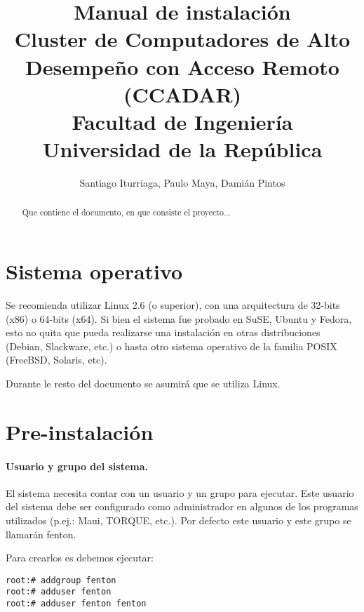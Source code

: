 \documentclass[a4paper,10pt,spanish]{article}
\begin{document}
\title{Manual de instalaci\'{o}n\\
Cluster de Computadores de Alto Desempe\~{n}o con Acceso Remoto (CCADAR)\\
Facultad de Ingenier\'{i}a\\
Universidad de la Rep\'{u}blica}

\author{Santiago Iturriaga, Paulo Maya, Dami\'{a}n Pintos}
\date{}

\maketitle
\begin{abstract}
Que contiene el documento, en que consiste el proyecto...
\end{abstract}
\newpage{}\tableofcontents{}\newpage{}

\section{Sistema operativo}

Se recomienda utilizar Linux 2.6 (o superior), con una arquitectura de 32-bits (x86) o 64-bits (x64). Si bien el sistema fue probado en SuSE, Ubuntu y Fedora, esto no quita que pueda realizarse una instalaci\'{o}n en otras distribuciones (Debian, Slackware, etc.) o hasta otro sistema operativo de la familia POSIX (FreeBSD, Solaris, etc).

Durante le resto del documento se asumir\'{a} que se utiliza Linux.

\section{Pre-instalaci\'{o}n}

\paragraph{Usuario y grupo del sistema.}

El sistema necesita contar con un usuario y un grupo para ejecutar. Este usuario del sistema debe ser configurado como administrador en algunos de los programas utilizados (p.ej.: Maui, TORQUE, etc.). Por defecto este usuario y este grupo se llamar\'{a}n fenton.

Para crearlos es debemos ejecutar:

\begin{verbatim}
root:# addgroup fenton
root:# adduser fenton
root:# adduser fenton fenton
\end{verbatim}
\end{document}

